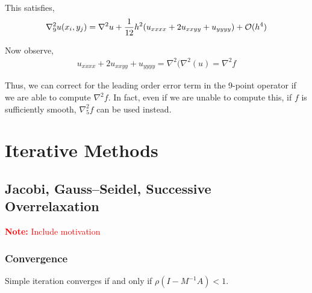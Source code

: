 \documentclass[12pt]{article}
\newcommand{\note}[1]{\textcolor{red}{\textbf{Note:} #1}}
\begin{document}
This satisfies,
\begin{align*}
    \nabla_9^2 u(x_i,y_j) = \nabla^2 u + \dfrac{1}{12}h^2 (u_{xxxx}+2u_{xxyy} + u_{yyyy}) + \mathcal{O}(h^4)
\end{align*}

Now observe,
\begin{align*}
    u_{xxxx}+2u_{xxyy} + u_{yyyy} = \nabla^2(\nabla^2(u) = \nabla^2 f
\end{align*}

Thus, we can correct for the leading order error term in the 9-point operator if we are able to compute \( \nabla^2 f \). In fact, even if we are unable to compute this, if \( f \) is sufficiently smooth, \( \nabla_5^2 f \) can be used instead.


\section{Iterative Methods}

\subsection{Jacobi, Gauss--Seidel, Successive Overrelaxation}

\note{Include motivation}

\begin{algorithm}
\begin{algorithmic}
\EndFor
\end{algorithmic}
\end{algorithm}

\subsubsection{Convergence}

\begin{theorem}
Simple iteration converges if and only if \( \rho(I-M^{-1}A) < 1 \).
\end{theorem}
\end{document}
